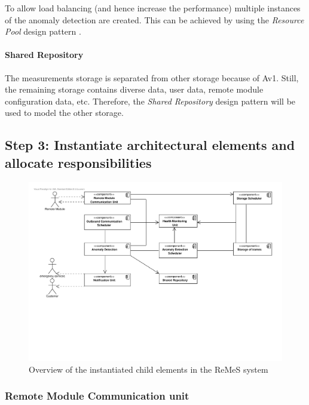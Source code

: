 \npar To allow load balancing (and hence increase the performance) multiple
instances of the anomaly detection are created. This can be achieved by using
the \emph{Resource Pool} design pattern \citep[see][p.~503]{Buschmann:07}. 

\paragraph{Shared Repository}

\npar The measurements storage is separated from other storage because of Av1.
Still, the remaining storage contains diverse data, user data, remote module
configuration data, etc. Therefore, the \emph{Shared Repository} design pattern
\citep[see][p.~202]{Buschmann:07} will be used to model the other storage.

\subsection{Step 3: Instantiate architectural elements and allocate responsibilities}
\label{add:it1/elements}

\begin{figure}[H]
	\begin{centering}
		\includegraphics[width=\textwidth]{figs/add-it1-elements.pdf}
		\caption{Overview of the instantiated child elements in the ReMeS system}
		\label{fig:it1/elements}
	\end{centering}
\end{figure}


\subsubsection{Remote Module Communication unit}

